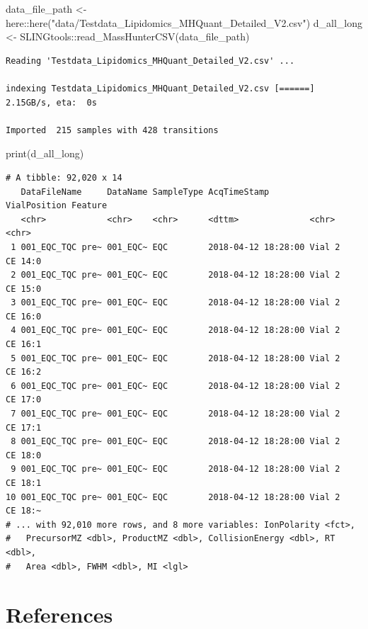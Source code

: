 \documentclass[
  letterpaper,
  DIV=11,
  numbers=noendperiod]{scrreprt}
\newenvironment{Shaded}{\begin{snugshade}}{\end{snugshade}}
\newcommand{\FunctionTok}[1]{\textcolor[rgb]{0.28,0.35,0.67}{#1}}
\newcommand{\NormalTok}[1]{\textcolor[rgb]{0.00,0.23,0.31}{#1}}
\newcommand{\OtherTok}[1]{\textcolor[rgb]{0.00,0.23,0.31}{#1}}
\newcommand{\SpecialCharTok}[1]{\textcolor[rgb]{0.37,0.37,0.37}{#1}}
\newcommand{\StringTok}[1]{\textcolor[rgb]{0.13,0.47,0.30}{#1}}
\newlength{\cslhangindent}
\newlength{\cslentryspacingunit} %
\newenvironment{CSLReferences}[2] %
 {%
  \setlength{\parindent}{0pt}
  \ifodd #1
  \let\oldpar\par
  \def\par{\hangindent=\cslhangindent\oldpar}
  \fi
  \setlength{\parskip}{#2\cslentryspacingunit}
 }%
 {}
\begin{document}
\begin{Shaded}
\begin{Highlighting}[]
\NormalTok{data\_file\_path }\OtherTok{\textless{}{-}}\NormalTok{ here}\SpecialCharTok{::}\FunctionTok{here}\NormalTok{(}\StringTok{"data/Testdata\_Lipidomics\_MHQuant\_Detailed\_V2.csv"}\NormalTok{)}
\NormalTok{d\_all\_long }\OtherTok{\textless{}{-}}\NormalTok{ SLINGtools}\SpecialCharTok{::}\FunctionTok{read\_MassHunterCSV}\NormalTok{(data\_file\_path)}
\end{Highlighting}
\end{Shaded}

\begin{verbatim}
Reading 'Testdata_Lipidomics_MHQuant_Detailed_V2.csv' ... 

indexing Testdata_Lipidomics_MHQuant_Detailed_V2.csv [======] 2.15GB/s, eta:  0s
                                                                                
Imported  215 samples with 428 transitions 
\end{verbatim}

\begin{Shaded}
\begin{Highlighting}[]
\FunctionTok{print}\NormalTok{(d\_all\_long)}
\end{Highlighting}
\end{Shaded}

\begin{verbatim}
# A tibble: 92,020 x 14
   DataFileName     DataName SampleType AcqTimeStamp        VialPosition Feature
   <chr>            <chr>    <chr>      <dttm>              <chr>        <chr>  
 1 001_EQC_TQC pre~ 001_EQC~ EQC        2018-04-12 18:28:00 Vial 2       CE 14:0
 2 001_EQC_TQC pre~ 001_EQC~ EQC        2018-04-12 18:28:00 Vial 2       CE 15:0
 3 001_EQC_TQC pre~ 001_EQC~ EQC        2018-04-12 18:28:00 Vial 2       CE 16:0
 4 001_EQC_TQC pre~ 001_EQC~ EQC        2018-04-12 18:28:00 Vial 2       CE 16:1
 5 001_EQC_TQC pre~ 001_EQC~ EQC        2018-04-12 18:28:00 Vial 2       CE 16:2
 6 001_EQC_TQC pre~ 001_EQC~ EQC        2018-04-12 18:28:00 Vial 2       CE 17:0
 7 001_EQC_TQC pre~ 001_EQC~ EQC        2018-04-12 18:28:00 Vial 2       CE 17:1
 8 001_EQC_TQC pre~ 001_EQC~ EQC        2018-04-12 18:28:00 Vial 2       CE 18:0
 9 001_EQC_TQC pre~ 001_EQC~ EQC        2018-04-12 18:28:00 Vial 2       CE 18:1
10 001_EQC_TQC pre~ 001_EQC~ EQC        2018-04-12 18:28:00 Vial 2       CE 18:~
# ... with 92,010 more rows, and 8 more variables: IonPolarity <fct>,
#   PrecursorMZ <dbl>, ProductMZ <dbl>, CollisionEnergy <dbl>, RT <dbl>,
#   Area <dbl>, FWHM <dbl>, MI <lgl>
\end{verbatim}


\hypertarget{references}{%
\chapter*{References}\label{references}}

\hypertarget{refs}{}
\begin{CSLReferences}{0}{0}
\end{CSLReferences}
\end{document}
